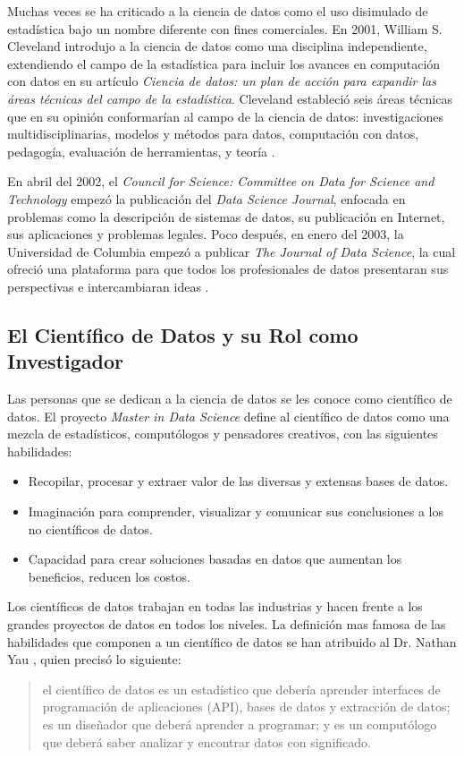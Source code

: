 Muchas veces se ha criticado a la ciencia de datos como el uso disimulado de estadística bajo un nombre diferente con fines comerciales. En 2001, William S. Cleveland introdujo a la ciencia de datos como una disciplina independiente, extendiendo el campo de la estadística para incluir los avances en computación con datos en su artículo \textit{Ciencia de datos: un plan de acción para expandir las áreas técnicas del campo de la estadística}. Cleveland estableció seis áreas técnicas que en su opinión conformarían al campo de la ciencia de datos: investigaciones multidisciplinarias, modelos y métodos para datos, computación con datos, pedagogía, evaluación de herramientas, y teoría \cite{cleveland}.

En abril del 2002, el \textit{ Council for Science: Committee on Data for Science and Technology} \cite{CODATA} empezó la publicación del \textit{Data Science Journal}, enfocada en problemas como la descripción de sistemas de datos, su publicación en Internet, sus aplicaciones y problemas legales. Poco después, en enero del 2003, la Universidad de Columbia empezó a publicar \textit{The Journal of Data Science}, la cual ofreció una plataforma para que todos los profesionales de datos presentaran sus perspectivas e intercambiaran ideas \cite{wikipediaDS}.

\subsection{El Científico de Datos y su Rol como Investigador}
Las personas que se dedican a la ciencia de datos se les conoce como científico de datos. El proyecto \textit{Master in Data Science} define al científico de datos como una mezcla de estadísticos, computólogos y pensadores creativos, con las siguientes habilidades:

\begin{itemize}
	\item Recopilar, procesar y extraer valor de las diversas y extensas bases de datos.
	\item Imaginación para comprender, visualizar y comunicar sus conclusiones a los no científicos de datos.
	\item Capacidad para crear soluciones basadas en datos que aumentan los beneficios, reducen los costos.
\end{itemize}

Los científicos de datos trabajan en todas las industrias y hacen frente a los grandes proyectos de datos en todos los niveles. La definición mas famosa de las habilidades que componen a un científico de datos se han atribuido al Dr. Nathan Yau \cite{yau}, quien precisó lo siguiente: \begin{quote} el científico de datos es un estadístico que debería aprender interfaces de programación de aplicaciones (API), bases de datos y extracción de datos; es un diseñador que deberá aprender a programar; y es un computólogo que deberá saber analizar y encontrar datos con significado. \end{quote}

